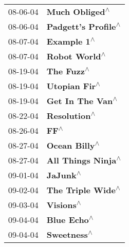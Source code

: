 \begin{supertabular}{p{0.25\columnwidth}p{0.75\columnwidth}}
 08-06-04 &                                                             \textbf{Much Obliged\textsuperscript{$\wedge$}} \\
 08-06-04 &                                                        \textbf{Padgett's Profile\textsuperscript{$\wedge$}} \\
 08-07-04 &                                                                \textbf{Example 1\textsuperscript{$\wedge$}} \\
 08-07-04 &                                                              \textbf{Robot World\textsuperscript{$\wedge$}} \\
 08-19-04 &                                                                 \textbf{The Fuzz\textsuperscript{$\wedge$}} \\
 08-19-04 &                                                              \textbf{Utopian Fir\textsuperscript{$\wedge$}} \\
 08-19-04 &                                                           \textbf{Get In The Van\textsuperscript{$\wedge$}} \\
 08-22-04 &                                                               \textbf{Resolution\textsuperscript{$\wedge$}} \\
 08-26-04 &                                                                       \textbf{FF\textsuperscript{$\wedge$}} \\
 08-27-04 &                                                              \textbf{Ocean Billy\textsuperscript{$\wedge$}} \\
 08-27-04 &                                                         \textbf{All Things Ninja\textsuperscript{$\wedge$}} \\
 09-01-04 &                                                                   \textbf{JaJunk\textsuperscript{$\wedge$}} \\
 09-02-04 &                                                          \textbf{The Triple Wide\textsuperscript{$\wedge$}} \\
 09-03-04 &                                                                  \textbf{Visions\textsuperscript{$\wedge$}} \\
 09-04-04 &                                                                \textbf{Blue Echo\textsuperscript{$\wedge$}} \\
 09-04-04 &                                                                \textbf{Sweetness\textsuperscript{$\wedge$}} \\

\end{supertabular}
